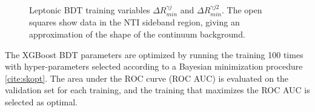\begin{figure}[htbp]
  \centering
  \caption{Leptonic BDT training variables $\Delta R_{min}^{\gamma j}$ and $\Delta R_{min}^{\gamma j2}$.  The open squares show data in the NTI sideband region, giving an approximation of the shape of the continuum background. }
  \label{fig:lepvbls7}
\end{figure}

\clearpage

The XGBoost BDT parameters are optimized by running the training 100 times with hyper-parameters selected according to a Bayesian minimization procedure \ref{cite:skopt}. The area under the ROC curve (ROC AUC) is evaluated on the validation set for each training, and the training that maximizes the ROC AUC is selected as optimal.


